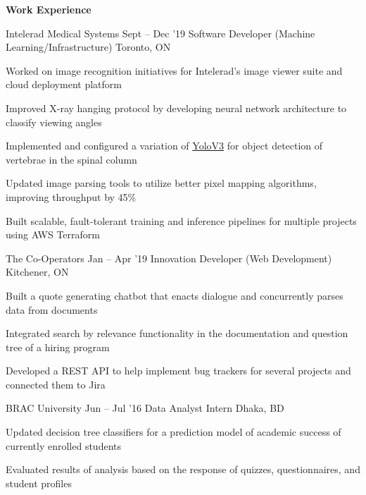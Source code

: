\documentclass{resume} %
\DeclareRobustCommand{\&}{%
  \ifdim\fontdimen1\font>0pt
    \textsl{\symbol{`\&}}%
  \else
    \symbol{`\&}%
  \fi
}
\begin{document}
\begin{rSection}{\textbf{Work Experience}}

  \begin{rSubsection}{Intelerad Medical Systems}
   {Sept -- Dec '19}
   		{Software Developer (Machine Learning/Infrastructure)}
		{Toronto, ON}
		\item Worked on image recognition initiatives for Intelerad's image viewer suite and cloud deployment platform
		\item Improved X-ray hanging protocol by developing neural network architecture to classify viewing angles
		\item Implemented and configured a variation of {\underline{\href{https://pjreddie.com/media/files/papers/YOLOv3.pdf}{YoloV3}}} for object detection of vertebrae in the spinal column
		\item Updated image parsing tools to utilize better pixel mapping algorithms, improving throughput by 45\%
		\item Built scalable, fault-tolerant training and inference pipelines for multiple projects using AWS Terraform
  \end{rSubsection}

  \begin{rSubsection}{The Co-Operators}
    {Jan -- Apr '19}
         {Innovation Developer (Web Development)}
         {Kitchener, ON}
       \item Built a quote generating chatbot that enacts dialogue and concurrently parses data from documents
       \item Integrated search by relevance functionality in the documentation and question tree of a hiring program
        \item Developed a REST API to help implement bug trackers for several projects and connected them to Jira

  \end{rSubsection}

	\begin{rSubsection}{BRAC University}
		{Jun -- Jul '16}
		{Data Analyst Intern}
		{Dhaka, BD}
		\item Updated decision tree classifiers for a prediction model of academic success of currently enrolled students
		\item Evaluated results of analysis based on the response of quizzes, questionnaires, and student profiles
	\end{rSubsection}
  
\end{rSection} 
\end{document}
